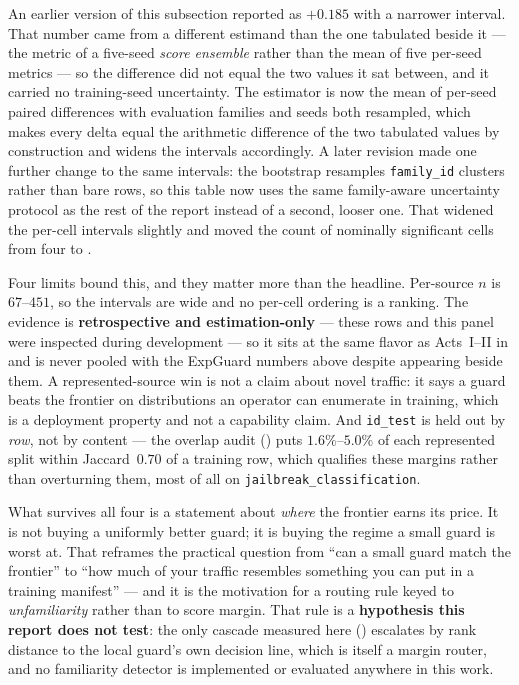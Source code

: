\documentclass[11pt]{article}
\newcommand{\code}[1]{\texttt{\small #1}}
\begin{document}
An earlier version of this subsection reported \HtwoBestDeltaTpr{} as $+0.185$ with a narrower
interval. That number came from a different estimand than the one tabulated beside it --- the
metric of a five-seed \emph{score ensemble} rather than the mean of five per-seed metrics --- so
the difference did not equal the two values it sat between, and it carried no training-seed
uncertainty. The estimator is now the mean of per-seed paired differences with evaluation families
and seeds both resampled, which makes every delta equal the arithmetic difference of the two
tabulated values by construction and widens the intervals accordingly. A later revision made one
further change to the same intervals: the bootstrap resamples \code{family\_id} clusters rather
than bare rows, so this table now uses the same family-aware uncertainty protocol as the rest of
the report instead of a second, looser one. That widened the per-cell intervals slightly and moved
the count of nominally significant cells from four to \HtwoNSigNominal{}.


Four limits bound this, and they matter more than the headline. Per-source $n$ is $67$--$451$,
so the intervals are wide and no per-cell ordering is a ranking. The evidence is
\textbf{retrospective and estimation-only} --- these rows and this panel were inspected during
development --- so it sits at the same flavor as Acts~I--II in  and is never
pooled with the ExpGuard numbers above despite appearing beside them. A represented-source win
is not a claim about novel traffic: it says a guard beats the frontier on distributions an
operator can enumerate in training, which is a deployment property and not a capability claim.
And \code{id\_test} is held out by \emph{row}, not by content --- the overlap audit
() puts $1.6\%$--$5.0\%$ of each represented split within
Jaccard~$0.70$ of a training row, which qualifies these margins rather than overturning them,
most of all on \code{jailbreak\_classification}.

What survives all four is a statement about \emph{where} the frontier earns its price. It is not
buying a uniformly better guard; it is buying the regime a small guard is worst at. That
reframes the practical question from ``can a small guard match the frontier'' to ``how much of
your traffic resembles something you can put in a training manifest'' --- and it is the
motivation for a routing rule keyed to \emph{unfamiliarity} rather than to score margin. That
rule is a \textbf{hypothesis this report does not test}: the only cascade measured here
() escalates by rank distance to the local guard's own decision line,
which is itself a margin router, and no familiarity detector is implemented or evaluated anywhere
in this work.
\end{document}
